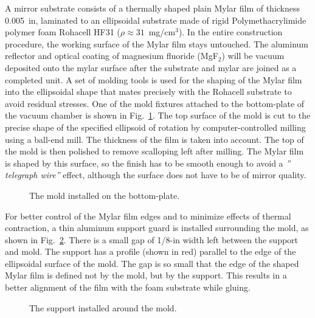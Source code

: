 A mirror substrate consists of a thermally shaped plain Mylar film of 
thickness 0.005~in, laminated to an ellipsoidal substrate made of rigid 
Polymethacrylimide polymer foam Rohacell HF31 ($\rho \approx 31$~mg/cm$^3$). 
In the entire construction procedure, the working surface of the Mylar film 
stays untouched. The aluminum reflector and optical coating of magnesium 
fluoride (MgF$_2$) will be vacuum deposited onto the mylar surface after 
the substrate and mylar are joined as a completed unit. A set of molding 
tools is used for the shaping of the Mylar film into the ellipsoidal shape 
that mates precisely with the Rohacell substrate to avoid residual stresses.  
One of the mold fixtures attached to the bottom-plate of the vacuum chamber 
is shown in Fig.~\ref{mold}.  The top surface of the mold is cut to the 
precise shape of the specified ellipsoid of rotation by computer-controlled 
milling using a ball-end mill. The thickness of the film is taken into 
account.  The top of the mold is then polished to remove scalloping left 
after milling.  The Mylar film is shaped by this surface, so the finish 
has to be smooth enough to avoid a {\it'' telegraph wire''} effect, although 
the surface does not have to be of mirror quality.  
 
\begin{figure}
\begin{center}
\caption{\small{The mold installed on the bottom-plate.}}
\label{mold}
\end{center}
\end{figure} 

For better control of the Mylar film edges and to minimize effects of 
thermal contraction, a thin aluminum support guard is installed surrounding 
the mold, as shown in Fig.~\ref{support1}.  There is a small gap of 1/8-in 
width left between the support and mold.  The support has a profile (shown 
in red) parallel to the edge of the ellipsoidal surface of the mold.  The gap 
is so small that the edge of the shaped Mylar film is defined not by the
mold, but by the support.  This results in a better alignment of the film 
with the foam substrate while gluing.

\begin{figure}
\begin{center}
\caption{\small{The support installed around the mold.}}
\label{support1}
\end{center}
\end{figure}  

